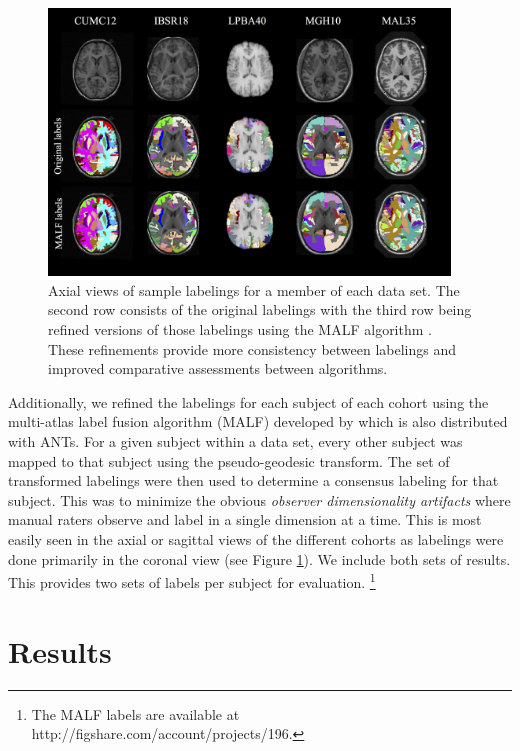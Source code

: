 \documentclass{frontiersSCNS}
\begin{document}
\begin{figure}[htb]
  \centering
  \includegraphics[width=0.95\textwidth]{labels.jpg}
  \caption{Axial views of sample labelings for a member of each data set.  
  The second row consists of the original labelings with the third row being
  refined versions of those labelings using the MALF algorithm \citep{wang2012}.
  These refinements provide more consistency between labelings and improved
  comparative assessments between algorithms.
  }
  \label{fig:labels}
\end{figure}

Additionally, we refined the labelings for each subject of each cohort
using the multi-atlas label fusion algorithm (MALF) developed by \cite{wang2012}
which is also distributed with ANTs.
For a given subject within a data set, every other subject was mapped to 
that subject using the pseudo-geodesic transform.  The set of transformed labelings 
were then used to determine a consensus labeling for that subject.
This was to minimize the obvious {\it observer dimensionality artifacts} where manual
raters observe and label in a single dimension at a time.  This
is most easily seen in the axial or sagittal views of the different cohorts 
as labelings were done primarily in the coronal view (see Figure \ref{fig:labels}).  
We include both sets of results.  This provides two sets of labels per subject
for evaluation.%
\footnote{
The MALF labels are available at http://figshare.com/account/projects/196.
}



\section{Results}
\end{document}
